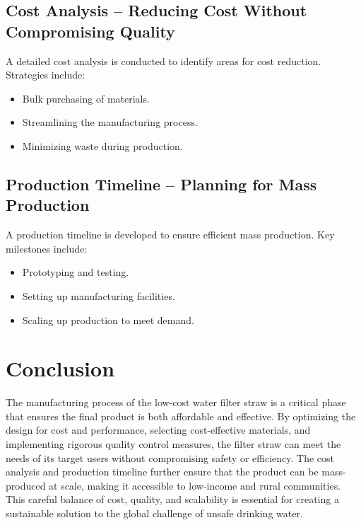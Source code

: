 \documentclass{article}
\begin{document}
\vspace{0.5cm}

\subsection{Cost Analysis – Reducing Cost Without Compromising Quality}
A detailed cost analysis is conducted to identify areas for cost reduction. Strategies include:
\begin{itemize}
    \item Bulk purchasing of materials.
    \item Streamlining the manufacturing process.
    \item Minimizing waste during production.
\end{itemize}

\vspace{0.5cm}

\subsection{Production Timeline – Planning for Mass Production}
A production timeline is developed to ensure efficient mass production. Key milestones include:
\begin{itemize}
    \item Prototyping and testing.
    \item Setting up manufacturing facilities.
    \item Scaling up production to meet demand.
\end{itemize}

\vspace{0.5cm}

\section*{Conclusion}
The manufacturing process of the low-cost water filter straw is a critical phase that ensures the final product is both affordable and effective. By optimizing the design for cost and performance, selecting cost-effective materials, and implementing rigorous quality control measures, the filter straw can meet the needs of its target users without compromising safety or efficiency. The cost analysis and production timeline further ensure that the product can be mass-produced at scale, making it accessible to low-income and rural communities. This careful balance of cost, quality, and scalability is essential for creating a sustainable solution to the global challenge of unsafe drinking water.
\end{document}
